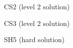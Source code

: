 \documentclass[10pt,letterpaper]{article}
\begin{document}
\noindent\begin{minipage}{0.47\linewidth}\begin{center}
CS2 (level 2 solution) \\
\end{center}\end{minipage}
\hfill
\begin{minipage}{0.47\linewidth}\begin{center}
CS3 (level 2 solution) \\
\end{center}\end{minipage}


\begin{minipage}{0.47\linewidth}\begin{center}
SH5 (hard solution) \\
\end{center}\end{minipage}\hfill
\end{document}
